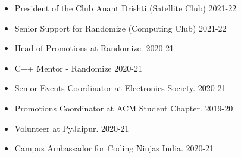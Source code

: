 \documentclass[10pt,a4paper,ragged2e]{altacv}
\begin{document}

\begin{itemize}
    \item President of the Club Anant Drishti (Satellite Club) 2021-22
    \item Senior Support for Randomize (Computing Club) 2021-22
    \item Head of Promotions at Randomize. 2020-21
    \item C++ Mentor - Randomize 2020-21
    \item Senior Events Coordinator at Electronics Society. 2020-21
    \item Promotions Coordinator at ACM Student Chapter. 2019-20
    \item Volunteer at PyJaipur. 2020-21
    \item Campus Ambassador for Coding Ninjas India. 2020-21
   
\end{itemize}












































\end{document}
